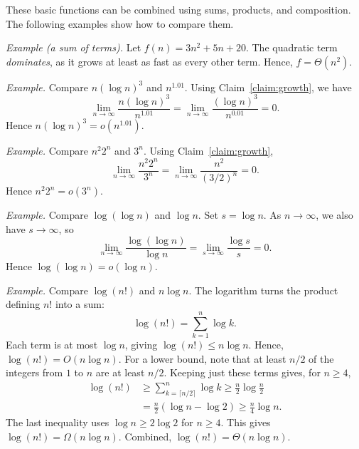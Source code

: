 These basic functions can be combined using sums, products, and composition.
The following examples show how to compare them.

\emph{Example (a sum of terms).} Let $f(n)=3n^2+5n+20$.
The quadratic term \emph{dominates}, as it grows
at least as fast as every other term.
Hence, $f = \Theta(n^2)$.


\emph{Example.}
Compare $n (\log n)^3$ and $n^{1.01}$. Using Claim~\ref{claim:growth},
we have
\[
    \lim_{n\to\infty}\frac{n (\log n)^3}{n^{1.01}}
    = \lim_{n\to\infty}\frac{(\log n)^3}{n^{0.01}} = 0
.
\]
Hence $n (\log n)^3 = o(n^{1.01})$.


\emph{Example.}
Compare $n^2 2^n$ and $3^n$. Using Claim~\ref{claim:growth},
\[
    \lim_{n\to\infty}\frac{n^2 2^n}{3^n}
    =\lim_{n\to\infty}\frac{n^2}{(3/2)^n}=0.
\]
Hence $n^2 2^n = o(3^n)$.

\emph{Example.} Compare $\log(\log n)$ and $\log n$.
Set $s=\log n$.
As $n\to\infty$, we also have $s\to\infty$, so
\[
    \lim_{n\to\infty}\frac{\log(\log n)}{\log n}
    =\lim_{s\to\infty}\frac{\log s}{s}=0.
\]
Hence $\log(\log n) =o(\log n)$.

\emph{Example.} Compare $\log(n!)$ and
$n\log n$. The logarithm turns the product defining $n!$ into a sum:
\[
    \log(n!)=\sum_{k=1}^{n}\log k.
\]
Each term is at most $\log n$, giving $\log(n!)\le n\log n$.
Hence, $\log(n!) = O(n\log n)$.
For a lower bound, note that at least $n/2$ of the integers from $1$ to $n$ are
at least $n/2$. Keeping just these terms gives, for $n\ge 4$,
\[
\begin{aligned}
    \log(n!) &\ge \sum_{k=\lceil n/2\rceil}^n \log k
    \ge \frac{n}{2}\log\frac{n}{2} \\
    &=\frac{n}{2}(\log n-\log 2)
    \ge \frac{n}{4}\log n.
\end{aligned}
\]
The last inequality uses $\log n\ge 2\log 2$ for $n\ge 4$.
This gives $\log(n!)=\Omega(n\log n)$.
Combined, $\log(n!)=\Theta(n\log n)$.


